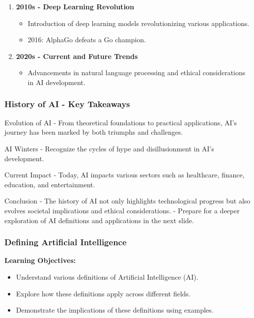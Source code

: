 \documentclass[aspectratio=169]{beamer}
\begin{document}
\begin{frame}[fragile]
\begin{enumerate}
        \item \textbf{2010s - Deep Learning Revolution}
        \begin{itemize}
            \item Introduction of deep learning models revolutionizing various applications.
            \item 2016: AlphaGo defeats a Go champion.
        \end{itemize}

        \item \textbf{2020s - Current and Future Trends}
        \begin{itemize}
            \item Advancements in natural language processing and ethical considerations in AI development.
        \end{itemize}
    \end{enumerate}
\end{frame}

\begin{frame}[fragile]
    \frametitle{History of AI - Key Takeaways}
    \begin{block}{Evolution of AI}
        - From theoretical foundations to practical applications, AI's journey has been marked by both triumphs and challenges.
    \end{block}

    \begin{block}{AI Winters}
        - Recognize the cycles of hype and disillusionment in AI's development.
    \end{block}

    \begin{block}{Current Impact}
        - Today, AI impacts various sectors such as healthcare, finance, education, and entertainment.
    \end{block}

    \begin{block}{Conclusion}
        - The history of AI not only highlights technological progress but also evolves societal implications and ethical considerations.
        - Prepare for a deeper exploration of AI definitions and applications in the next slide.
    \end{block}
\end{frame}

\begin{frame}[fragile]
    \frametitle{Defining Artificial Intelligence}
    
    \textbf{Learning Objectives:}
    \begin{itemize}
        \item Understand various definitions of Artificial Intelligence (AI).
        \item Explore how these definitions apply across different fields.
        \item Demonstrate the implications of these definitions using examples.
    \end{itemize}
    
\end{frame}
\end{document}
